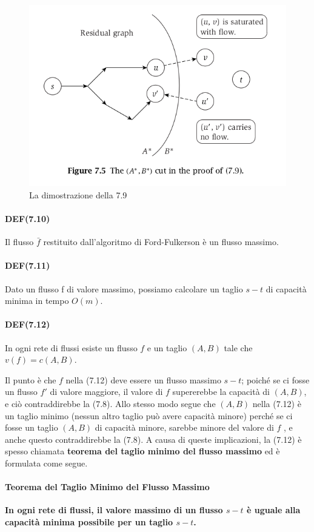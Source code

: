 \begin{figure}[H]
    \centering
    \includegraphics[width = 10 cm]{Network_flow/imgs/flow4.png}
    \caption{La dimostrazione della 7.9}
\end{figure}

\paragraph{DEF(7.10)}

\begin{myblockquote}
Il flusso $\bar{f}$ restituito dall'algoritmo di Ford-Fulkerson è un
flusso massimo.
\end{myblockquote}

\paragraph{DEF(7.11)}

\begin{myblockquote}
Dato un flusso f di valore massimo, possiamo calcolare un taglio $s-t$
di capacità minima in tempo $O(m)$.
\end{myblockquote}


\paragraph{DEF(7.12)}

\begin{myblockquote}
In ogni rete di flussi esiste un flusso $f$ e un taglio $(A, B)$
tale che $v(f) = c(A, B)$.
\end{myblockquote}

Il punto è che $f$ nella (7.12) deve essere un flusso massimo $s-t$;
poiché se ci fosse un flusso $f'$ di valore maggiore, il valore di
$f$ supererebbe la capacità di $(A, B)$, e ciò contraddirebbe la
(7.8). Allo stesso modo segue che $(A, B)$ nella (7.12) è un taglio
minimo (nessun altro taglio può avere capacità minore) perché se ci
fosse un taglio $(A , B)$ di capacità minore, sarebbe minore del
valore di $f$ , e anche questo contraddirebbe la (7.8). A causa di
queste implicazioni, la (7.12) è spesso chiamata \textbf{teorema del
taglio minimo del flusso massimo} ed è formulata come segue.

\paragraph{Teorema del Taglio Minimo del Flusso Massimo}

\begin{myblockquote}
\textbf{In ogni rete di flussi, il valore massimo di un flusso $s-t$ è
uguale alla capacità minima possibile per un taglio $s-t$.}
\end{myblockquote}